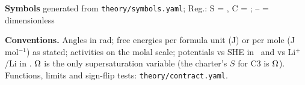\documentclass[9pt]{extarticle}
\begin{document}
\newpage
{\large\bfseries Symbols} \hfill {\small generated from \texttt{theory/symbols.yaml}; Reg.: S = \Rs, C = \Rc; -- = dimensionless}

\smallskip
{\setlength{\extrarowheight}{-1pt}}

{\footnotesize \textbf{Conventions.} Angles in rad; free energies per formula unit (J) or per mole (J\,mol$^{-1}$) as stated; activities on the molal scale; potentials vs SHE in \Rs\ and vs Li$^+$/Li in \Rc. $\Omega$ is the only supersaturation variable (the charter's $S$ for C3 is $\Omega$). Functions, limits and sign-flip tests: \texttt{theory/contract.yaml}.}
\end{document}
